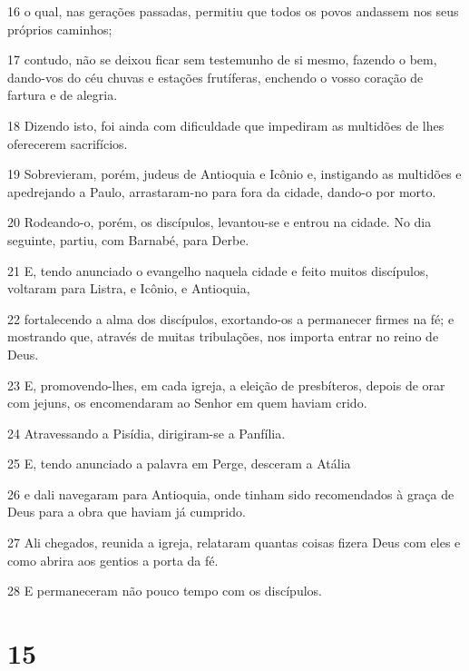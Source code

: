 \par 16 o qual, nas gerações passadas, permitiu que todos os povos andassem nos seus próprios caminhos;
\par 17 contudo, não se deixou ficar sem testemunho de si mesmo, fazendo o bem, dando-vos do céu chuvas e estações frutíferas, enchendo o vosso coração de fartura e de alegria.
\par 18 Dizendo isto, foi ainda com dificuldade que impediram as multidões de lhes oferecerem sacrifícios.
\par 19 Sobrevieram, porém, judeus de Antioquia e Icônio e, instigando as multidões e apedrejando a Paulo, arrastaram-no para fora da cidade, dando-o por morto.
\par 20 Rodeando-o, porém, os discípulos, levantou-se e entrou na cidade. No dia seguinte, partiu, com Barnabé, para Derbe.
\par 21 E, tendo anunciado o evangelho naquela cidade e feito muitos discípulos, voltaram para Listra, e Icônio, e Antioquia,
\par 22 fortalecendo a alma dos discípulos, exortando-os a permanecer firmes na fé; e mostrando que, através de muitas tribulações, nos importa entrar no reino de Deus.
\par 23 E, promovendo-lhes, em cada igreja, a eleição de presbíteros, depois de orar com jejuns, os encomendaram ao Senhor em quem haviam crido.
\par 24 Atravessando a Pisídia, dirigiram-se a Panfília.
\par 25 E, tendo anunciado a palavra em Perge, desceram a Atália
\par 26 e dali navegaram para Antioquia, onde tinham sido recomendados à graça de Deus para a obra que haviam já cumprido.
\par 27 Ali chegados, reunida a igreja, relataram quantas coisas fizera Deus com eles e como abrira aos gentios a porta da fé.
\par 28 E permaneceram não pouco tempo com os discípulos.

\chapter{15}


